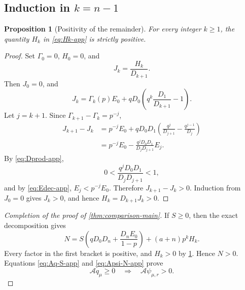 \documentclass[11pt]{article}
\theoremstyle{plain}
\newtheorem{proposition}[theorem]{Proposition}
\theoremstyle{definition}
\theoremstyle{remark}
\newcommand{\cA}{\mathcal A}
\begin{document}
\subsection{Induction in \texorpdfstring{$k=n-1$}{k=n-1}}

\begin{proposition}[Positivity of the remainder]\label{prop:H-positive-app}
For every integer \(k\ge1\), the quantity \(H_k\) in \eqref{eq:Hk-app} is strictly positive.
\end{proposition}

\begin{proof}
Set \(\Gamma_0=0\), \(H_0=0\), and
\[
J_k=\frac{H_k}{D_{k+1}}.
\]
Then \(J_0=0\), and
\[
J_k
=\Gamma_k(p)E_0
+qD_0\left(q^k\frac{D_1}{D_{k+1}}-1\right).
\]
Let \(j=k+1\).  Since \(\Gamma_{k+1}-\Gamma_k=p^{-j}\),
\begin{align*}
J_{k+1}-J_k
&=p^{-j}E_0
+qD_0D_1\left(\frac{q^j}{D_{j+1}}-\frac{q^{j-1}}{D_j}\right)\\
&=p^{-j}E_0
-\frac{q^jD_0D_1}{D_jD_{j+1}}E_j.
\end{align*}
By \eqref{eq:Dprod-app},
\[
0<\frac{q^jD_0D_1}{D_jD_{j+1}}<1,
\]
and by \eqref{eq:Edec-app}, \(E_j<p^{-j}E_0\).  Therefore \(J_{k+1}-J_k>0\).  Induction from \(J_0=0\) gives \(J_k>0\), and hence \(H_k=D_{k+1}J_k>0\).
\end{proof}

\begin{proof}[Completion of the proof of \cref{thm:comparison-main}]
If \(S\ge0\), then the exact decomposition gives
\[
N
=S\left(qD_0D_n+\frac{D_nE_0}{1-p}\right)
+(a+n)p^kH_k.
\]
Every factor in the first bracket is positive, and \(H_k>0\) by \cref{prop:H-positive-app}.  Hence \(N>0\).  Equations \eqref{eq:Aq-S-app} and \eqref{eq:Apsi-N-app} prove
\[
\cA q_\mu\ge0
\quad\Longrightarrow\quad
\cA\psi_{\mu,r}>0.
\]
\end{proof}
\end{document}
